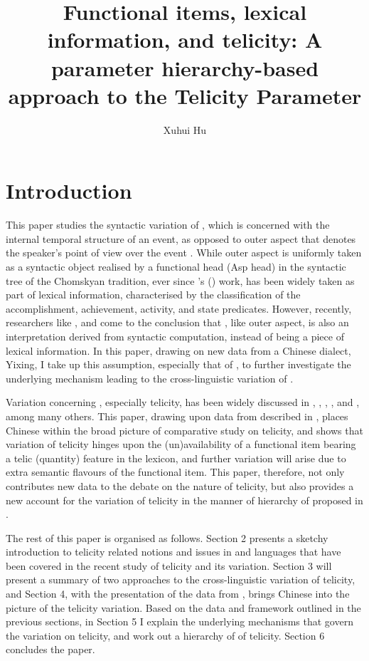 \documentclass[output=paper]{langsci/langscibook}
\author{Xuhui Hu\affiliation{Peking University}}
\title{Functional items, lexical information, and telicity: A parameter
hierarchy-based approach to the Telicity Parameter}
\begin{document}
\glsresetall

\section{Introduction}\label{sec:17.1}

This paper studies the syntactic variation of , which is
concerned with the internal temporal structure of an event, as opposed to outer
aspect \citep[7]{travis1991} that denotes the speaker's point of view over the
event \citep{smith1997parameter}. While outer aspect is uniformly taken as a
syntactic object realised by a functional head (Asp head) in the syntactic tree
of the Chomskyan tradition, ever since \citeauthor{vendler1957verbs}'s
(\citeyear{vendler1957verbs}) work,  has been widely taken as
part of lexical information, characterised by the classification of the
accomplishment, achievement, activity, and state predicates. However, recently,
researchers like \textcite{Borer2005a,Borer2005b,Borer2013},
\textcite{MacDonald2008} and \textcite{travis2010inner} come to the conclusion
that , like outer aspect, is also an interpretation derived
from syntactic computation, instead of being a piece of lexical information. In
this paper, drawing on new data from a Chinese dialect, Yixing, I take up this
assumption, especially that of \textcite{Borer2005a,Borer2005b,Borer2013}, to
further investigate the underlying mechanism leading to the cross-linguistic
variation of .

Variation concerning , especially telicity, has been widely
discussed in \textcite{filip1997,filip2000}, \textcite{filiprothstein2005},
\textcite{Borer2005a,Borer2005b}, \textcite{MacDonald2008}, and
\textcite{travis2010inner},  among many others. This paper, drawing upon data
from  described in \textcite{Huxuhui2016}, places Chinese
within the broad picture of comparative study on telicity, and shows that
variation of telicity hinges upon the (un)availability of a functional item
bearing a telic (quantity) feature in the lexicon, and further variation will
arise due to extra semantic flavours of the functional item. This paper,
therefore, not only contributes new data to the debate on the nature of
telicity, but also provides a new account for the variation of telicity in the
manner of hierarchy of  proposed in \textcite{robertsonline}.

The rest of this paper is organised as follows. Section 2 presents a sketchy
introduction to telicity related notions and issues in  and
languages that have been covered in the recent study of telicity and its
variation. Section 3 will present a summary of two approaches to the
cross-linguistic variation of telicity, and Section 4, with the presentation of
the data from , brings Chinese into the picture of the
telicity variation. Based on the data and framework outlined in the previous
sections, in Section 5 I explain the underlying mechanisms that govern the
variation on telicity, and work out a hierarchy of  of telicity.
Section 6 concludes the paper.
\end{document}
